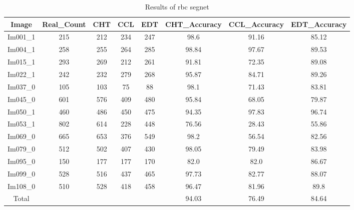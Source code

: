 \begin{table}[H]
\centering
\begin{tabular}{|c|c|c|c|c|c|c|c|}
\hline
 \textbf{Image} & \textbf{Real\_Count} & \textbf{CHT} & \textbf{CCL} & \textbf{EDT} & \textbf{CHT\_Accuracy} & \textbf{CCL\_Accuracy} & \textbf{EDT\_Accuracy} \\ \hline
 Im001\_1 & 215 & 212 & 234 & 247 & 98.6 & 91.16 & 85.12 \\ 
 Im004\_1 & 258 & 255 & 264 & 285 & 98.84 & 97.67 & 89.53 \\ 
 Im015\_1 & 293 & 269 & 212 & 261 & 91.81 & 72.35 & 89.08 \\ 
 Im022\_1 & 242 & 232 & 279 & 268 & 95.87 & 84.71 & 89.26 \\ 
 Im037\_0 & 105 & 103 & 75 & 88 & 98.1 & 71.43 & 83.81 \\ 
 Im045\_0 & 601 & 576 & 409 & 480 & 95.84 & 68.05 & 79.87 \\ 
 Im050\_1 & 460 & 486 & 450 & 475 & 94.35 & 97.83 & 96.74 \\ 
 Im053\_1 & 802 & 614 & 228 & 448 & 76.56 & 28.43 & 55.86 \\ 
 Im069\_0 & 665 & 653 & 376 & 549 & 98.2 & 56.54 & 82.56 \\ 
 Im079\_0 & 512 & 502 & 407 & 430 & 98.05 & 79.49 & 83.98 \\ 
 Im095\_0 & 150 & 177 & 177 & 170 & 82.0 & 82.0 & 86.67 \\ 
 Im099\_0 & 528 & 516 & 437 & 465 & 97.73 & 82.77 & 88.07 \\ 
 Im108\_0 & 510 & 528 & 418 & 458 & 96.47 & 81.96 & 89.8 \\ \hline
 Total &  &   &   &   & 94.03 & 76.49 & 84.64 \\ 

\hline
\end{tabular}
\caption{Results of rbc segnet}
\label{Results of rbc segnet}
\end{table}
